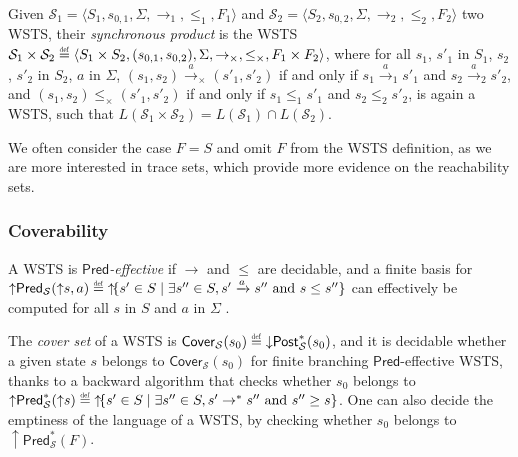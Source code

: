 \documentclass[11pt,reqno,a4paper]{amsart}
\newcommand{\eqdef}{\stackrel{\raisebox{-.15ex}{\scalebox{.5}{\upshape\textrm{def}}}}{=}}
\newcommand{\tup}[1]{\langle #1\rangle}
\newcommand{\dc}{\mathop{\downarrow}\!}
\newcommand{\uc}{\mathop{\uparrow}\!}
\newcommand{\ra}{\mathrel{\rightarrow^\ast}}
\newcommand{\ru}[1]{\xrightarrow{#1}}
\renewcommand{\cite}{\citep}
\theoremstyle{plain}
\theoremstyle{definition}
\theoremstyle{remark}
\renewcommand{\paragraph}{\subsubsection*}
\begin{document}
Given
$\mathcal{S}_1=\tup{S_1,s_{0,1},\Sigma,{\rightarrow_1},{\leq_1},F_1}$
and
$\mathcal{S}_2=\tup{S_2,s_{0,2},\Sigma,{\rightarrow_2},{\leq_2},F_2}$ two WSTS,
their \emph{synchronous product} is the WSTS
$\mathcal{S}_1\times\mathcal{S}_2\eqdef\tup{S_1\times
  S_2,(s_{0,1},s_{0,2}),\Sigma,{\rightarrow_\times},{\leq_\times},F_1\times
  F_2}$, where for all $s_1$, $s'_1$ in $S_1$, $s_2$, $s'_2$ in $S_2$,
$a$ in $\Sigma$, $(s_1,s_2)\ru{a}_\times(s'_1,s'_2)$ if and only if
$s_1\ru{a}_1 s'_1$ and $s_2\ru{a}_2 s'_2$, and
$(s_1,s_2)\leq_\times(s'_1,s'_2)$ if and only if $s_1\leq_1s'_1$ and
$s_2\leq_2s'_2$, is again a WSTS, such that
$L(\mathcal{S}_1\times\mathcal{S}_2)=L(\mathcal{S}_1)\cap
L(\mathcal{S}_2)$.

We often consider the case $F=S$ and omit $F$ from the WSTS definition,
as we are more interested in trace sets, which provide more evidence
on the reachability sets.

\paragraph{Coverability}
A WSTS is \emph{$\mathsf{Pred}$-effective} if $\rightarrow$ and $\leq$
are decidable, and a finite basis for
$\uc\mathsf{Pred}_{\mathcal{S}}(\uc s, a)\eqdef\uc\{s'\in S\mid\exists
s''\in S,s'\ru{a}s''\text{ and }s\leq s''\}$ can effectively be
computed for all $s$ in $S$ and $a$ in $\Sigma$ \cite{wsts}.

The \emph{cover set} of a WSTS is
$\mathsf{Cover}_{\mathcal{S}}(s_0)\eqdef\dc\mathsf{Post}^\ast_{\mathcal{S}}(s_0)$,
and it is decidable whether a given state $s$ belongs to
$\mathsf{Cover}_{\mathcal{S}}(s_0)$ for finite branching
$\mathsf{Pred}$-effective WSTS, thanks to a backward algorithm that
checks whether $s_0$ belongs to
$\uc\mathsf{Pred}^\ast_{\mathcal{S}}(\uc s)\eqdef\uc\{s'\in
S\mid\exists s''\in S,s'\ra s''\text{ and }s''\geq s\}$.  One can also
decide the emptiness of the language of a WSTS, by checking whether
$s_0$ belongs to $\uc\mathsf{Pred}^\ast_{\mathcal{S}}(F)$.
\end{document}
